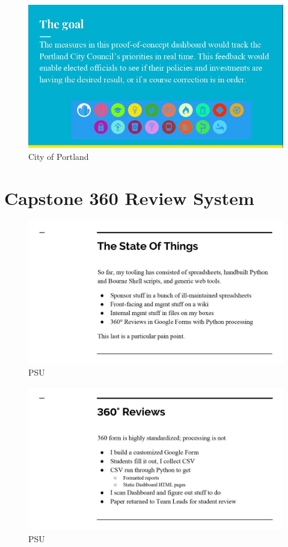 \begin{figure}[h!]
\centering
\includegraphics[width=0.8\linewidth]{P4-a.jpg}
\caption[City of Portland]{City of Portland}
\label{fig:City of Portland}
\end{figure}	

\newpage

\section*{Capstone 360 Review System}

\begin{figure}[h!]
\centering
\includegraphics[width=0.8\linewidth]{P5-a.jpg}
\caption[PSU]{PSU}
\label{fig:PSU}
\end{figure}	

\begin{figure}[h!]
\centering
\includegraphics[width=0.8\linewidth]{P5-b.jpg}
\caption[PSU]{PSU}
\label{fig:PSU}
\end{figure}	
\newpage

